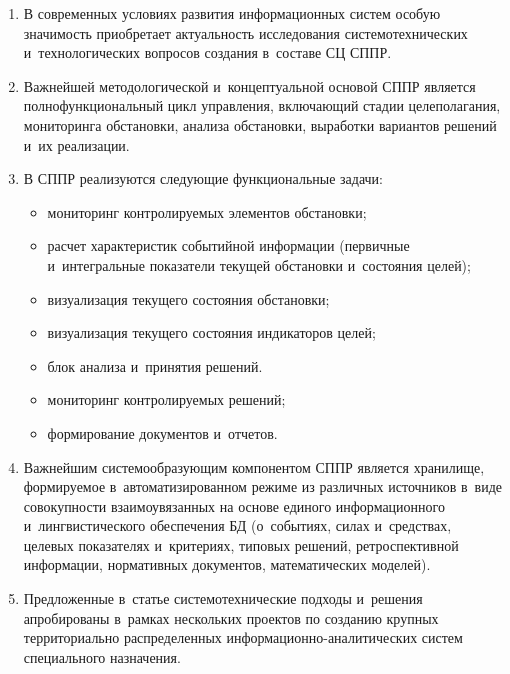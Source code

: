 \begin{multicols}{2}
\noindent
\begin{enumerate}[1.]
\item В современных условиях развития информационных сис\-тем особую 
значимость приобретает актуальность исследования сис\-те\-мо\-тех\-ни\-че\-ских 
и~технологических вопросов создания в~составе СЦ
СППР.
\item Важнейшей методологической и~концептуальной основой СППР 
является полнофункциональный цикл управления, включающий стадии 
целеполагания, мониторинга обстановки, анализа обстановки, выработки 
вариантов решений и~их реализации.
\item В СППР реализуются следующие функциональные задачи:
\begin{itemize}
\item мониторинг контролируемых элементов обстановки;
\item расчет характеристик событийной информации (первичные 
и~интегральные показатели текущей обстановки и~состояния 
целей);
\item визуализация текущего состояния обстановки;
\item визуализация текущего состояния индикаторов целей;
\item блок анализа и~принятия решений.
\item мониторинг контролируемых решений;
\item формирование документов и~отчетов.
\end{itemize}
\item Важнейшим сис\-те\-мо\-обра\-зу\-ющим компонентом СППР является 
хранилище, формируемое в~автоматизированном режиме из различных 
источников в~виде совокупности взаимоувязанных на основе единого 
информационного и~лингвистического обеспечения БД (о~событиях, 
силах и~средствах, целевых показателях и~критериях, типовых решений, 
ретроспективной информации, нормативных документов, математических 
моделей).
\item Предложенные в~статье сис\-те\-мо\-тех\-ни\-че\-ские подходы и~решения 
апробированы в~рамках нескольких проектов по созданию крупных 
территориально распределенных  
ин\-фор\-ма\-ци\-он\-но-ана\-ли\-ти\-че\-ских сис\-тем специального 
назначения.
\end{enumerate}

\vspace*{-6pt}

{\small\frenchspacing
 {%
 \begin{thebibliography}{9}


\end{thebibliography}}}
\end{multicols}
